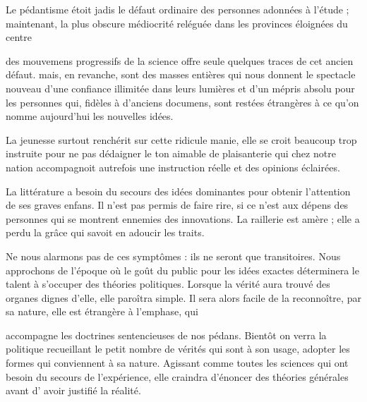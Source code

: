 \documentclass[11pt,a4paper]{article}
\begin{document}
Le pédantisme étoit jadis le défaut ordinaire des personnes adonnées
 à l'étude ; maintenant, la plus obscure
médiocrité reléguée dans les provinces éloignées du centre

des mouvemens progressifs de la science offre seule quelques traces de
cet ancien défaut. mais, en revanche,  sont des masses
entières qui  nous donnent le spectacle nouveau d'une
confiance illimitée dans leurs lumières et d'un mépris absolu pour les
personnes qui, fidèles à d'anciens documens, sont restées étrangères à
ce qu'on nomme aujourd'hui les nouvelles idées.

La jeunesse surtout renchérit sur cette ridicule manie, elle se croit
beaucoup trop instruite pour ne pas dédaigner le ton aimable de
plaisanterie qui chez notre nation accompagnoit autrefois une
instruction réelle et des opinions éclairées.

La littérature a besoin du secours des idées dominantes pour obtenir
l'attention de ses graves enfans. Il n'est pas permis de faire rire, si
ce n'est aux dépens des  personnes qui se montrent
ennemies des innovations. La raillerie est amère ; elle a perdu la
grâce qui savoit en adoucir les traits.


Ne nous alarmons pas de ces  symptômes : ils ne
seront que transitoires. Nous approchons de l'époque où le goût du
public pour les idées exactes déterminera le talent à s'occuper des
théories politiques. Lorsque la vérité aura trouvé des organes dignes
d'elle, elle paroîtra simple. Il sera alors facile de la reconnoître,
par sa nature, elle est étrangère à l'emphase, qui

accompagne les doctrines sentencieuses de nos  pédans.
Bientôt on verra la politique recueillant le petit nombre de vérités qui
sont à son usage, adopter les formes qui conviennent à sa nature.
Agissant comme toutes les sciences qui ont besoin du secours de
l'expérience, elle craindra  d'énoncer des théories
générales avant d' avoir justifié la réalité.
\end{document}
